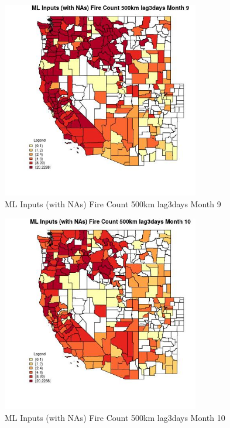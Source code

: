 \begin{figure} 
\centering  
\includegraphics[width=0.77\textwidth]{Code_Outputs/Report_ML_input_PM25_Step4_part_e_de_duplicated_aves_compiled_2019-05-20wNAs_CountyFire_Count_500km_lag3daysmedianMonth9.jpg} 
\caption{\label{fig:Report_ML_input_PM25_Step4_part_e_de_duplicated_aves_compiled_2019-05-20wNAsCountyFire_Count_500km_lag3daysmedianMonth9}ML Inputs (with NAs) Fire Count 500km lag3days Month 9} 
\end{figure} 
 

\begin{figure} 
\centering  
\includegraphics[width=0.77\textwidth]{Code_Outputs/Report_ML_input_PM25_Step4_part_e_de_duplicated_aves_compiled_2019-05-20wNAs_CountyFire_Count_500km_lag3daysmedianMonth10.jpg} 
\caption{\label{fig:Report_ML_input_PM25_Step4_part_e_de_duplicated_aves_compiled_2019-05-20wNAsCountyFire_Count_500km_lag3daysmedianMonth10}ML Inputs (with NAs) Fire Count 500km lag3days Month 10} 
\end{figure} 
 

